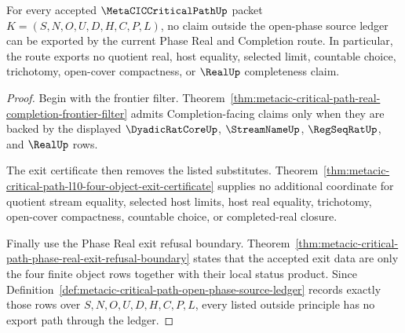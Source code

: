 \begin{theorem}
\label{thm:metacic-critical-path-open-phase-source-nonescape}
For every accepted $\MetaCICCriticalPathUp$ packet $K=(S,N,O,U,D,H,C,P,L)$, no claim outside the open-phase source ledger can be exported by the current Phase Real and Completion route. In particular, the route exports no quotient real, host equality, selected limit, countable choice, trichotomy, open-cover compactness, or $\RealUp$ completeness claim.
\end{theorem}
\begin{proof}
Begin with the frontier filter. Theorem~\ref{thm:metacic-critical-path-real-completion-frontier-filter} admits Completion-facing claims only when they are backed by the displayed $\DyadicRatCoreUp$, $\StreamNameUp$, $\RegSeqRatUp$, and $\RealUp$ rows.

The exit certificate then removes the listed substitutes. Theorem~\ref{thm:metacic-critical-path-l10-four-object-exit-certificate} supplies no additional coordinate for quotient stream equality, selected host limits, host real equality, trichotomy, open-cover compactness, countable choice, or completed-real closure.

Finally use the Phase Real exit refusal boundary. Theorem~\ref{thm:metacic-critical-path-phase-real-exit-refusal-boundary} states that the accepted exit data are only the four finite object rows together with their local status product. Since Definition~\ref{def:metacic-critical-path-open-phase-source-ledger} records exactly those rows over $S,N,O,U,D,H,C,P,L$, every listed outside principle has no export path through the ledger.
\end{proof}

